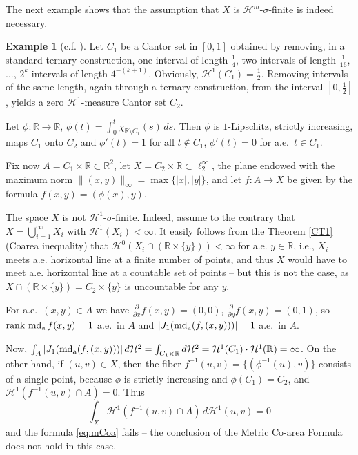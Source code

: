 \documentclass[12pt,leqno]{amsart}
\theoremstyle{definition}
\newtheorem{example}[theorem]{Example}
\newcommand{\bbbr}{\mathbb R}
\def\H{{\mathcal H}}
\def\rank{{\rm rank\,}}
\def\apmd{\operatorname{md_{\rm a}}}
\numberwithin{theorem}{section} \numberwithin{equation}{section}
\begin{document}
The next example shows that the assumption that $X$ is $\H^m$-$\sigma$-finite is indeed necessary.
\begin{example}[c.f. {\cite[Example 6.1]{reichel}}]
\label{ex:4.11}
Let $C_1$ be a Cantor set in $[0,1]$ obtained by removing, in a standard ternary construction, one interval of length $\frac{1}{4}$, two intervals of length $\frac{1}{16}$, ..., $2^k$ intervals of length $4^{-(k+1)}$. Obviously, $\H^1(C_1)=\frac{1}{2}$. Removing intervals of the same length, again through a ternary construction, from the interval $[0,\frac{1}{2}]$, yields a zero $\H^1$-measure Cantor set $C_2$.

Let $\phi:\bbbr\to\bbbr$, $\phi(t)=\int_0^t \chi_{\bbbr\setminus C_1}(s)\, ds$. Then $\phi$ is $1$-Lipschitz, strictly increasing, maps $C_1$ onto $C_2$ and $\phi'(t)=1$ for all $t\not \in C_1$, $\phi'(t)=0$ for a.e.\ $t\in C_1$.

Fix now $A=C_1\times\bbbr\subset\bbbr^2$,  let $X=C_2\times \bbbr\subset \ell_2^\infty$, the plane endowed with the maximum norm $\|(x,y)\|_\infty=\max\{|x|,|y|\}$, and let $f:A\to X$ be given by the formula $f(x,y)=(\phi(x),y)$.

The space $X$ is not $\H^1$-$\sigma$-finite. Indeed, assume to the contrary that $X=\bigcup_{i=1}^\infty X_i$ with $\H^1(X_i)<\infty$. It easily follows from the Theorem \ref{CT1} (Coarea inequality) that $\H^0(X_i\cap (\bbbr\times\{y\}))<\infty$ for a.e. $y\in\bbbr$, i.e., $X_i$ meets a.e. horizontal line at a finite number of points, and thus $X$ would have to meet a.e. horizontal line at a countable set of points -- but this is not the case, as $X\cap (\bbbr\times\{y\})=C_2\times\{y\}$ is uncountable for any $y$.

For a.e.\ $(x,y)\in A$ we have $\frac{\partial}{\partial x}f(x,y)=(0,0)$,  $\frac{\partial}{\partial y}f(x,y)=(0,1)$, so $\rank \apmd f(x,y)=1$ a.e.\ in $A$ and $|J_1(\apmd(f,(x,y)))|=1$ a.e.\ in $A$.

Now, $\int_A |J_1(\apmd (f,(x,y)))|\,d\H^2=\int_{C_1\times\bbbr}d\H^2=\H^1(C_1)\cdot \H^1(\bbbr)=\infty$. On the other hand, if $(u,v)\in X$, then the fiber $f^{-1}(u,v)=\{(\phi^{-1}(u),v)\}$ consists of a single point, because $\phi$ is strictly increasing and $\phi(C_1)=C_2$, and $\H^1(f^{-1}(u,v)\cap A)=0$. Thus
$$
\int_X \H^1(f^{-1}(u,v)\cap A)\, d\H^1(u,v) =0
$$
and the formula \eqref{eq:mCoa} fails -- the conclusion of the Metric Co-area Formula does not hold in this case.
\end{example}
\end{document}
